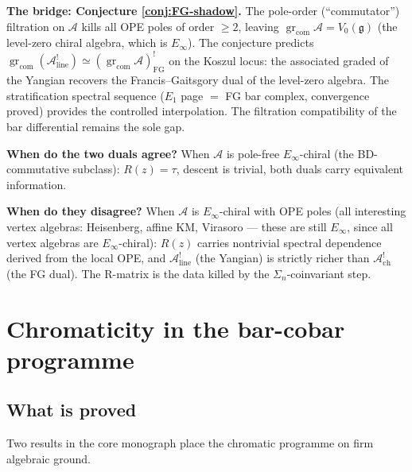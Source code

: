\documentclass[11pt]{article}
\newcommand{\cA}{\mathcal{A}}
\newcommand{\fg}{\mathfrak{g}}
\DeclareMathOperator{\gr}{gr}
\begin{document}
\medskip\noindent\textbf{The bridge: Conjecture
\textup{\ref{conj:FG-shadow}}.}\enspace
The pole-order (``commutator'') filtration on $\cA$ kills all
OPE poles of order $\ge 2$, leaving
$\gr_{\mathrm{com}}\cA = V_0(\fg)$ (the level-zero chiral
algebra, which is $E_\infty$).  The conjecture predicts
$\gr_{\mathrm{com}}(\cA^!_{\mathrm{line}})
\simeq (\gr_{\mathrm{com}}\cA)^!_{\mathrm{FG}}$
on the Koszul locus: the associated graded of the Yangian
recovers the Francis--Gaitsgory dual of the level-zero algebra.
The stratification spectral sequence ($E_1$ page $=$ FG bar
complex, convergence proved) provides the controlled
interpolation.  The filtration compatibility of the bar
differential remains the sole gap.

\medskip\noindent\textbf{When do the two duals agree?}\enspace
When $\cA$ is pole-free $E_\infty$-chiral (the
BD-commutative subclass): $R(z) = \tau$, descent is
trivial, both duals carry equivalent information.

\noindent\textbf{When do they disagree?}\enspace
When $\cA$ is $E_\infty$-chiral with OPE poles (all
interesting vertex algebras: Heisenberg, affine KM,
Virasoro --- these are still $E_\infty$, since all
vertex algebras are $E_\infty$-chiral): $R(z)$
carries nontrivial spectral dependence derived from
the local OPE, and $\cA^!_{\mathrm{line}}$ (the
Yangian) is strictly richer than
$\cA^!_{\mathrm{ch}}$ (the FG dual).
The R-matrix is the data killed by the $\Sigma_n$-coinvariant
step.


\section{Chromaticity in the bar-cobar programme}
\label{sec:chromatic-working-notes}

\subsection{What is proved}

Two results in the core monograph place the chromatic programme
on firm algebraic ground.
\end{document}

